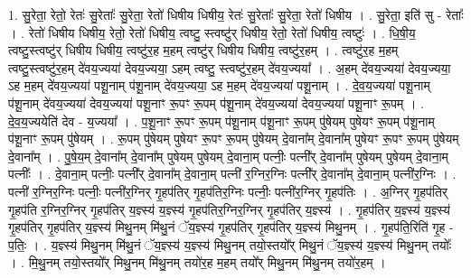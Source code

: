 \documentclass[17pt]{extarticle}
\begin{document}
1. सु॒रेता॒ रेतो॒ रेतः॑ सु॒रेताः᳚ सु॒रेता॒ रेतो॑ धिषीय धिषीय॒ रेतः॑ सु॒रेताः᳚ सु॒रेता॒ रेतो॑ धिषीय । . सु॒रेता॒ इति॑ सु - रेताः᳚ । . रेतो॑ धिषीय धिषीय॒ रेतो॒ रेतो॑ धिषीय॒ त्वष्टु॒ स्त्वष्टु॑र् धिषीय॒ रेतो॒ रेतो॑ धिषीय॒ त्वष्टुः॑ । . धि॒षी॒य॒ त्वष्टु॒स्त्वष्टु॑र् धिषीय धिषीय॒ त्वष्टु॑र॒ह म॒हम् त्वष्टु॑र् धिषीय धिषीय॒ त्वष्टु॑र॒हम् । . त्वष्टु॑र॒ह म॒हम् त्वष्टु॒स्त्वष्टु॑र॒हम् दे॑वय॒ज्यया॑ देवय॒ज्यया॒ ऽहम् त्वष्टु॒ स्त्वष्टु॑र॒हम् दे॑वय॒ज्यया᳚ । . अ॒हम् दे॑वय॒ज्यया॑ देवय॒ज्यया॒ ऽह म॒हम् दे॑वय॒ज्यया॑ पशू॒नाम् प॑शू॒नाम् दे॑वय॒ज्यया॒ ऽह म॒हम् दे॑वय॒ज्यया॑ पशू॒नाम् । . दे॒व॒य॒ज्यया॑ पशू॒नाम् प॑शू॒नाम् दे॑वय॒ज्यया॑ देवय॒ज्यया॑ पशू॒नाꣳ रू॒पꣳ रू॒पम् प॑शू॒नाम् दे॑वय॒ज्यया॑ देवय॒ज्यया॑ पशू॒नाꣳ रू॒पम् । . दे॒व॒य॒ज्ययेति॑ देव - य॒ज्यया᳚ । . प॒शू॒नाꣳ रू॒पꣳ रू॒पम् प॑शू॒नाम् प॑शू॒नाꣳ रू॒पम् पु॑षेयम् पुषेयꣳ रू॒पम् प॑शू॒नाम् प॑शू॒नाꣳ रू॒पम् पु॑षेयम् । . रू॒पम् पु॑षेयम् पुषेयꣳ रू॒पꣳ रू॒पम् पु॑षेयम् दे॒वाना᳚म् दे॒वाना᳚म् पुषेयꣳ रू॒पꣳ रू॒पम् पु॑षेयम् दे॒वाना᳚म् । . पु॒षे॒य॒म् दे॒वाना᳚म् दे॒वाना᳚म् पुषेयम् पुषेयम् दे॒वाना॒म् पत्नीः॒ पत्नी᳚र् दे॒वाना᳚म् पुषेयम् पुषेयम् दे॒वाना॒म् पत्नीः᳚ । . दे॒वाना॒म् पत्नीः॒ पत्नी᳚र् दे॒वाना᳚म् दे॒वाना॒म् पत्नी॑ र॒ग्निर॒ग्निः पत्नी᳚र् दे॒वाना᳚म् दे॒वाना॒म् पत्नी॑र॒ग्निः । . पत्नी॑ र॒ग्निर॒ग्निः पत्नीः॒ पत्नी॑र॒ग्निर् गृ॒हप॑तिर् गृ॒हप॑तिर॒ग्निः पत्नीः॒ पत्नी॑र॒ग्निर् गृ॒हप॑तिः । . अ॒ग्निर् गृ॒हप॑तिर् गृ॒हप॑ति र॒ग्निर॒ग्निर् गृ॒हप॑तिर् य॒ज्ञ्स्य॑ य॒ज्ञ्स्य॑ गृ॒हप॑तिर॒ग्निर॒ग्निर् गृ॒हप॑तिर् य॒ज्ञ्स्य॑ । . गृ॒हप॑तिर् य॒ज्ञ्स्य॑ य॒ज्ञ्स्य॑ गृ॒हप॑तिर् गृ॒हप॑तिर् य॒ज्ञ्स्य॑ मिथु॒नम् मि॑थु॒नं ॅय॒ज्ञ्स्य॑ गृ॒हप॑तिर् गृ॒हप॑तिर् य॒ज्ञ्स्य॑ मिथु॒नम् । . गृ॒हप॑ति॒रिति॑ गृ॒ह - प॒तिः॒ । . य॒ज्ञ्स्य॑ मिथु॒नम् मि॑थु॒नं ॅय॒ज्ञ्स्य॑ य॒ज्ञ्स्य॑ मिथु॒नम् तयो॒स्तयो᳚र् मिथु॒नं ॅय॒ज्ञ्स्य॑ य॒ज्ञ्स्य॑ मिथु॒नम् तयोः᳚ । . मि॒थु॒नम् तयो॒स्तयो᳚र् मिथु॒नम् मि॑थु॒नम् तयो॑र॒ह म॒हम् तयो᳚र् मिथु॒नम् मि॑थु॒नम् तयो॑र॒हम् । \newline
\end{document}
